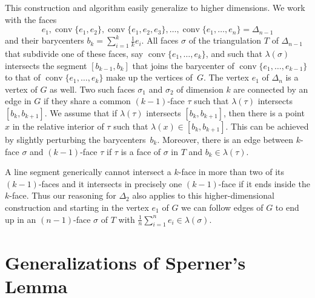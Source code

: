 \documentclass[a4paper,10pt,reqno, english]{amsart}
\theoremstyle{plain}
\theoremstyle{definition}
\DeclareMathOperator{\conv}{conv}
\begin{document}
This construction and algorithm easily generalize to higher dimensions. We work with the faces 
$$e_1, \conv\{e_1,e_2\}, \conv\{e_1,e_2,e_3\}, \dots, \conv\{e_1, \dots, e_n\} = \Delta_{n-1}$$
and their barycenters $b_k = \sum_{i=1}^k \frac1ke_i$. All faces $\sigma$ of the triangulation $T$ of $\Delta_{n-1}$ that subdivide one of these
faces, say $\conv\{e_1, \dots, e_k\}$, and such that $\lambda(\sigma)$ intersects the segment $[b_{k-1},b_k]$ that joins the barycenter of
$\conv\{e_1, \dots, e_{k-1}\}$ to that of $\conv\{e_1, \dots, e_k\}$ make up the vertices of~$G$. The vertex $e_1$ of $\Delta_n$ is a vertex of 
$G$ as well. Two such faces $\sigma_1$ and $\sigma_2$ of dimension $k$ are connected by an edge in $G$ if they share a common
$(k-1)$-face $\tau$ such that $\lambda(\tau)$ intersects $[b_k, b_{k+1}]$. We assume that if $\lambda(\tau)$ intersects $[b_k, b_{k+1}]$, 
then there is a point $x$ in the relative interior of $\tau$ such that $\lambda(x) \in [b_k, b_{k+1}]$. This can be achieved by slightly perturbing the 
barycenters~$b_k$.
Moreover, there is an edge between $k$-face $\sigma$ and $(k-1)$-face
$\tau$ if $\tau$ is a face of $\sigma$ in $T$ and $b_k \in \lambda(\tau)$.

A line segment generically cannot intersect a $k$-face in more than two of its $(k-1)$-faces and it intersects in precisely one $(k-1)$-face if
it ends inside the $k$-face. Thus our reasoning for $\Delta_2$ also applies to this higher-dimensional construction and starting in the vertex
$e_1$ of $G$ we can follow edges of $G$ to end up in an $(n-1)$-face $\sigma$ of $T$ with $\frac1n\sum_{i=1}^n e_i \in \lambda(\sigma)$.





\section{Generalizations of Sperner's Lemma}
\label{sec:generalizations}
\end{document}
